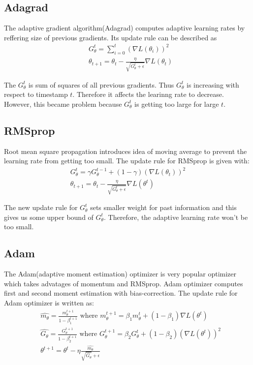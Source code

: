 \documentclass[11pt]{article}
\begin{document}
	\subsection{\cite{duchi2011adaptive} Adagrad}
	The adaptive gradient algorithm(Adagrad) computes adaptive learning rates by reffering size of previous gradients. Its update rule can be described as
	\begin{equation*}
		\begin{aligned}
			&G_\theta^t=\sum_{i=0}^t(\nabla L(\theta_i))^2\\
			&\theta_{t+1}=\theta_t-\frac{\eta}{\sqrt{G_\theta^t+\epsilon}}\nabla L(\theta_t)
		\end{aligned} 
	\end{equation*}

	The $G_\theta^t$ is sum of squares of all previous gradients. Thus $G_\theta^t$ is increasing with respect to timestamp $t$. Therefore it affects the learinng rate to decrease. However, this became problem because $G_\theta^t$ is getting too large for large $t$.

	\subsection{\cite{hinton2012neural} RMSprop}
	Root mean square propagation introduces idea of moving average to prevent the learning rate from getting too small. 
	The update rule for RMSprop is given with:
	\begin{equation*}
		\begin{aligned}
			G_\theta^t=\gamma G_\theta^{t-1}+(1-\gamma)(\nabla L(\theta_t))^2\\
			\theta_{t+1}=\theta_t-\frac{\eta}{\sqrt{G_\theta^t+\epsilon}}\nabla L(\theta^t)
		\end{aligned}
	\end{equation*}

	The new update rule for $G_\theta^t$ sets smaller weight for past information and this gives us some upper bound of $G_\theta^t$. Therefore, the adaptive learning rate won't be too small.

	\subsection{\cite{kingma2014adam} Adam}
	The Adam(adaptive moment estimation) optimizer is very popular optimizer which takes advatages of momentum and RMSprop. Adam optimizer computes first and second moment estimation with bias-correction. The update rule for Adam optimizer is written as:
	\begin{equation*}
		\begin{aligned}
			&\hat{m_\theta}=\frac{m_\theta^{t+1}}{1-\beta_1^{t+1}}\mbox{ where } m_\theta^{t+1}=\beta_1 m_\theta^t+(1-\beta_1)\nabla L(\theta^t)\\
			&\hat{G_\theta}=\frac{G_\theta^{t+1}}{1-\beta_2^{t+1}}\mbox{ where } G_\theta^{t+1}=\beta_2 G_\theta^t+(1-\beta_2)(\nabla L(\theta^t))^2\\
			&\theta^{t+1}=\theta^t-\eta\frac{\hat{m_\theta}}{\sqrt{\hat{G_\theta}}+\epsilon}
		\end{aligned}
	\end{equation*}
\end{document}
